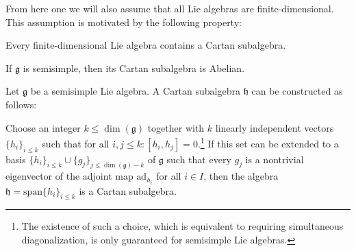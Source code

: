     From here one we will also assume that all Lie algebras are finite-dimensional. This assumption is motivated by the following property:
    \begin{property}
        Every finite-dimensional Lie algebra contains a Cartan subalgebra.
    \end{property}
    \begin{property}
       If $\mathfrak{g}$ is semisimple, then its Cartan subalgebra is Abelian.
    \end{property}

    \begin{construct}
        Let $\mathfrak{g}$ be a semisimple Lie algebra. A Cartan subalgebra $\mathfrak{h}$ can be constructed as follows:

        \qquad Choose an integer $k\leq\dim(\mathfrak{g})$ together with $k$ linearly independent vectors $\{h_i\}_{i\leq k}$ such that for all $i,j\leq k:[h_i,h_j] = 0$.\footnote{The existence of such a choice, which is equivalent to requiring simultaneous diagonalization, is only guaranteed for semisimple Lie algebras.} If this set can be extended to a basis $\{h_i\}_{i\leq k}\cup\{g_j\}_{j\leq \dim(\mathfrak{g})-k}$ of $\mathfrak{g}$ such that every $g_j$ is a nontrivial eigenvector of the adjoint map $\text{ad}_{h_i}$ for all $i\in I$, then the algebra $\mathfrak{h} = \text{span}\{h_i\}_{i\leq k}$ is a Cartan subalgebra.
    \end{construct}


